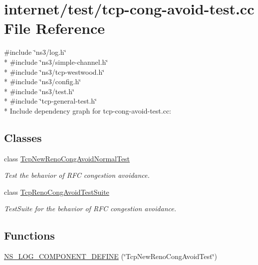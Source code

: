 \hypertarget{tcp-cong-avoid-test_8cc}{}\section{internet/test/tcp-\/cong-\/avoid-\/test.cc File Reference}
\label{tcp-cong-avoid-test_8cc}
{\ttfamily \#include \char`\"{}ns3/log.\+h\char`\"{}}\\*
{\ttfamily \#include \char`\"{}ns3/simple-\/channel.\+h\char`\"{}}\\*
{\ttfamily \#include \char`\"{}ns3/tcp-\/westwood.\+h\char`\"{}}\\*
{\ttfamily \#include \char`\"{}ns3/config.\+h\char`\"{}}\\*
{\ttfamily \#include \char`\"{}ns3/test.\+h\char`\"{}}\\*
{\ttfamily \#include \char`\"{}tcp-\/general-\/test.\+h\char`\"{}}\\*
Include dependency graph for tcp-\/cong-\/avoid-\/test.cc\+:
\subsection*{Classes}
\begin{DoxyCompactItemize}
\item 
class \hyperlink{classTcpNewRenoCongAvoidNormalTest}{Tcp\+New\+Reno\+Cong\+Avoid\+Normal\+Test}
\begin{DoxyCompactList}\small\item\em Test the behavior of R\+FC congestion avoidance. \end{DoxyCompactList}\item 
class \hyperlink{classTcpRenoCongAvoidTestSuite}{Tcp\+Reno\+Cong\+Avoid\+Test\+Suite}
\begin{DoxyCompactList}\small\item\em Test\+Suite for the behavior of R\+FC congestion avoidance. \end{DoxyCompactList}\end{DoxyCompactItemize}
\subsection*{Functions}
\begin{DoxyCompactItemize}
\item 
\hyperlink{tcp-cong-avoid-test_8cc_a148c93c4b74f400d69bfe1758be7d730}{N\+S\+\_\+\+L\+O\+G\+\_\+\+C\+O\+M\+P\+O\+N\+E\+N\+T\+\_\+\+D\+E\+F\+I\+NE} (\char`\"{}Tcp\+New\+Reno\+Cong\+Avoid\+Test\char`\"{})
\end{DoxyCompactItemize}
